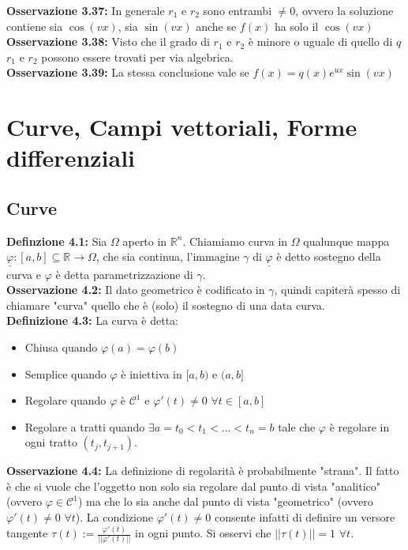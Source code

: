\documentclass[a4paper,11pt,titlepage]{book}
\begin{document}
\textbf{Osservazione 3.37:} In generale $r_1$ e $r_2$ sono entrambi $\ne 0$, ovvero la soluzione contiene sia $\cos(vx)$, sia $\sin(vx)$ anche se $f(x)$ ha solo il $\cos(vx)$\\

\textbf{Osservazione 3.38:} Visto che il grado di $r_1$ e $r_2$ è minore o uguale di quello di $q$ $r_1$ e $r_2$ possono essere trovati per via algebrica. \\

\textbf{Osservazione 3.39:} La stessa conclusione vale se $f(x)=q(x)e^{ux}\sin(vx)$

\chapter{Curve, Campi vettoriali, Forme differenziali}

\section{Curve}

\textbf{Definzione 4.1: }Sia $\Omega$ aperto in $\mathbb{R}^n$. Chiamiamo curva in $\Omega$ qualunque mappa $\underline{\varphi}:[a,b]\subseteq \mathbb{R}\to\Omega$, che sia continua, l'immagine $\gamma$ di $\underline{\varphi}$ è detto sostegno della curva e $\varphi$ è detta parametrizzazione di $\gamma$.\\

\textbf{Osservazione 4.2: }Il dato geometrico è codificato in $\gamma$, quindi capiterà spesso di chiamare "curva" quello che è (solo) il sostegno di una data curva.\\

\textbf{Definizione 4.3:} La curva è detta:\begin{itemize}
\item Chiusa quando $\varphi(a)=\varphi(b)$
\item Semplice quando $\varphi$ è iniettiva in $[a,b)$ e $(a,b]$
\item Regolare quando $\varphi$ è $\mathcal{C}^1$ e $\varphi'(t)\ne 0$ $\forall t\in[a,b]$
\item Regolare a tratti quando $\exists a=t_0<t_1<\ldots<t_n=b$ tale che $\varphi$ è regolare in ogni tratto $(t_j,t_{j+1})$.
\end{itemize}

\textbf{Osservazione 4.4: }La definizione di regolarità è probabilmente "strana". Il fatto è che si vuole che l'oggetto non solo sia regolare dal punto di vista "analitico" (ovvero $\varphi\in\mathcal{C}^1$) ma che lo sia anche dal punto di vista "geometrico" (ovvero $\varphi'(t)\ne 0$ $\forall t$). La condizione $\varphi'(t)\ne 0$ consente infatti di definire un versore tangente $\tau(t):=\frac{\varphi'(t)}{||\varphi'(t)||
}$ in ogni punto. Si osservi che $||\tau(t)||=1$ $\forall t$.
\end{document}
